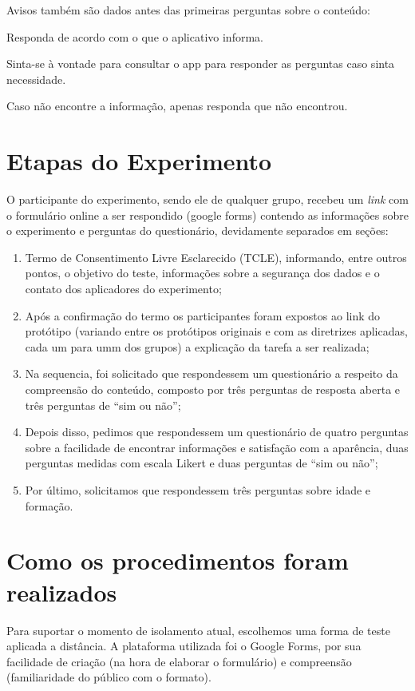 \documentclass[12pt]{article}
\begin{document}
Avisos também são dados antes das primeiras perguntas sobre o conteúdo:

Responda de acordo com o que o aplicativo informa. 

Sinta-se à vontade para consultar o app para responder as perguntas caso sinta necessidade. 

Caso não encontre a informação, apenas responda que não encontrou.

\section{Etapas do Experimento}
\label{experimento}

O participante do experimento, sendo ele de qualquer grupo, recebeu um \textit{link} com o formulário online a ser respondido (google forms) contendo as informações sobre o experimento e perguntas do questionário, devidamente separados em seções:

\begin{enumerate}
\item Termo de Consentimento Livre Esclarecido (TCLE), informando, entre outros pontos, o objetivo do teste, informações sobre a segurança dos dados e o contato dos aplicadores do experimento;
\item Após a confirmação do termo os participantes foram expostos ao link do protótipo (variando entre os protótipos originais e com as diretrizes aplicadas, cada um para umm dos grupos) a explicação da tarefa a ser realizada;
\item Na sequencia, foi solicitado que respondessem um questionário a respeito da compreensão do conteúdo, composto por três perguntas de resposta aberta e três perguntas de ``sim ou não'';
\item Depois disso, pedimos que respondessem um questionário de quatro perguntas sobre a facilidade de encontrar informações e satisfação com a aparência, duas perguntas medidas com escala Likert e duas perguntas de ``sim ou não'';
\item Por último, solicitamos que respondessem três perguntas sobre idade e formação.
\end{enumerate}

\section{Como os procedimentos foram realizados}

Para suportar o momento de isolamento atual, escolhemos uma forma de teste aplicada a distância. A plataforma utilizada foi o Google Forms, por sua facilidade de criação (na hora de elaborar o formulário) e compreensão (familiaridade do público com o formato).
\end{document}
